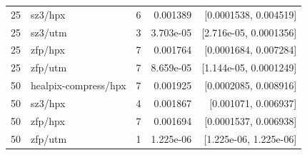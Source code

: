 \begin{table}[t]
\begin{tabular}{@{}llrrr@{}}
25 & sz3/hpx & 6 & 0.001389 & [0.0001538, 0.004519] \\
25 & sz3/utm & 3 & 3.703e-05 & [2.716e-05, 0.0001356] \\
25 & zfp/hpx & 7 & 0.001764 & [0.0001684, 0.007284] \\
25 & zfp/utm & 7 & 8.659e-05 & [1.144e-05, 0.0001249] \\
50 & healpix-compress/hpx & 7 & 0.001925 & [0.0002085, 0.008916] \\
50 & sz3/hpx & 4 & 0.001867 & [0.001071, 0.006937] \\
50 & zfp/hpx & 7 & 0.001694 & [0.0001537, 0.006938] \\
50 & zfp/utm & 1 & 1.225e-06 & [1.225e-06, 1.225e-06] \\
\bottomrule
\end{tabular}
\end{table}
